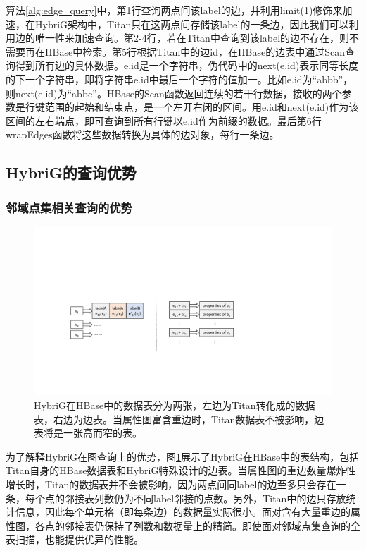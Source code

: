 算法\ref{alg:edge_query}中，第1行查询两点间该label的边，并利用limit(1)修饰来加速，在HybriG架构中，Titan只在这两点间存储该label的一条边，因此我们可以利用边的唯一性来加速查询。第2-4行，若在Titan中查询到该label的边不存在，则不需要再在HBase中检索。第5行根据Titan中的边id，在HBase的边表中通过Scan查询得到所有边的具体数据。e.id是一个字符串，伪代码中的next(e.id)表示同等长度的下一个字符串，即将字符串e.id中最后一个字符的值加一。比如e.id为“abbb”，则next(e.id)为“abbc”。HBase的Scan函数返回连续的若干行数据，接收的两个参数是行键范围的起始和结束点，是一个左开右闭的区间。用e.id和next(e.id)作为该区间的左右端点，即可查询到所有行键以e.id作为前缀的数据。最后第6行wrapEdges函数将这些数据转换为具体的边对象，每行一条边。

\subsection{HybriG的查询优势}
\subsubsection{邻域点集相关查询的优势}

\begin{figure}[htbp]
\centering
\includegraphics[width=150mm]{fig/curr_list.pdf}
\caption[HybriG在HBase中的数据表]{HybriG在HBase中的数据表分为两张，左边为Titan转化成的数据表，右边为边表。当属性图富含重边时，Titan数据表不被影响，边表将是一张高而窄的表。}
\label{fig:curr_list}
\end{figure}

为了解释HybriG在图查询上的优势，图\ref{fig:curr_list}展示了HybriG在HBase中的表结构，包括Titan自身的HBase数据表和HybriG特殊设计的边表。当属性图的重边数量爆炸性增长时，Titan的数据表并不会被影响，因为两点间同label的边至多只会存在一条，每个点的邻接表列数仍为不同label邻接的点数。另外，Titan中的边只存放统计信息，因此每个单元格（即每条边）的数据量实际很小。面对含有大量重边的属性图，各点的邻接表仍保持了列数和数据量上的精简。即使面对邻域点集查询的全表扫描，也能提供优异的性能。

